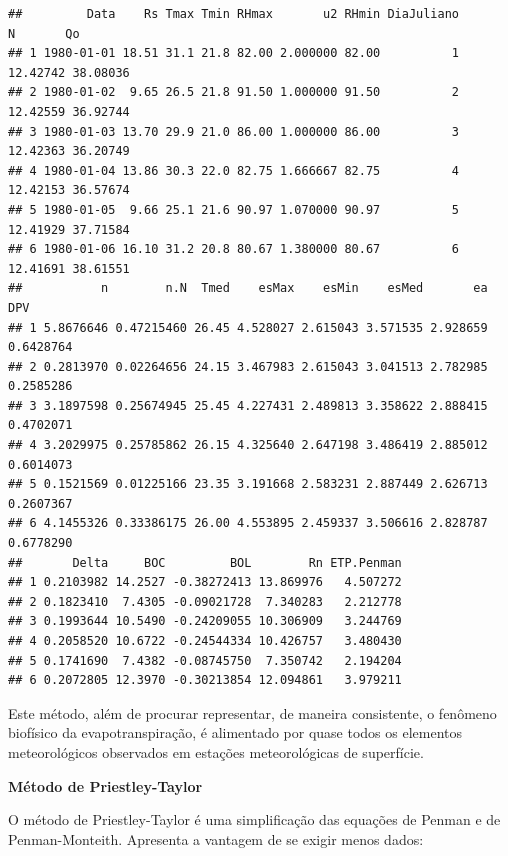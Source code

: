 \documentclass[
]{book}
\newenvironment{Shaded}{\begin{snugshade}}{\end{snugshade}}
\newcommand{\DecValTok}[1]{\textcolor[rgb]{0.00,0.00,0.81}{#1}}
\newcommand{\FloatTok}[1]{\textcolor[rgb]{0.00,0.00,0.81}{#1}}
\newcommand{\KeywordTok}[1]{\textcolor[rgb]{0.13,0.29,0.53}{\textbf{#1}}}
\newcommand{\NormalTok}[1]{#1}
\newcommand{\OperatorTok}[1]{\textcolor[rgb]{0.81,0.36,0.00}{\textbf{#1}}}
\newcommand{\StringTok}[1]{\textcolor[rgb]{0.31,0.60,0.02}{#1}}
\begin{document}
\begin{verbatim}
##         Data    Rs Tmax Tmin RHmax       u2 RHmin DiaJuliano        N       Qo
## 1 1980-01-01 18.51 31.1 21.8 82.00 2.000000 82.00          1 12.42742 38.08036
## 2 1980-01-02  9.65 26.5 21.8 91.50 1.000000 91.50          2 12.42559 36.92744
## 3 1980-01-03 13.70 29.9 21.0 86.00 1.000000 86.00          3 12.42363 36.20749
## 4 1980-01-04 13.86 30.3 22.0 82.75 1.666667 82.75          4 12.42153 36.57674
## 5 1980-01-05  9.66 25.1 21.6 90.97 1.070000 90.97          5 12.41929 37.71584
## 6 1980-01-06 16.10 31.2 20.8 80.67 1.380000 80.67          6 12.41691 38.61551
##           n        n.N  Tmed    esMax    esMin    esMed       ea       DPV
## 1 5.8676646 0.47215460 26.45 4.528027 2.615043 3.571535 2.928659 0.6428764
## 2 0.2813970 0.02264656 24.15 3.467983 2.615043 3.041513 2.782985 0.2585286
## 3 3.1897598 0.25674945 25.45 4.227431 2.489813 3.358622 2.888415 0.4702071
## 4 3.2029975 0.25785862 26.15 4.325640 2.647198 3.486419 2.885012 0.6014073
## 5 0.1521569 0.01225166 23.35 3.191668 2.583231 2.887449 2.626713 0.2607367
## 6 4.1455326 0.33386175 26.00 4.553895 2.459337 3.506616 2.828787 0.6778290
##       Delta     BOC         BOL        Rn ETP.Penman
## 1 0.2103982 14.2527 -0.38272413 13.869976   4.507272
## 2 0.1823410  7.4305 -0.09021728  7.340283   2.212778
## 3 0.1993644 10.5490 -0.24209055 10.306909   3.244769
## 4 0.2058520 10.6722 -0.24544334 10.426757   3.480430
## 5 0.1741690  7.4382 -0.08745750  7.350742   2.194204
## 6 0.2072805 12.3970 -0.30213854 12.094861   3.979211
\end{verbatim}

Este método, além de procurar representar, de maneira consistente, o fenômeno biofísico da evapotranspiração, é alimentado por quase todos os elementos meteorológicos observados em estações meteorológicas de superfície.

\textbf{Método de Priestley-Taylor}

O método de Priestley-Taylor é uma simplificação das equações de Penman e de Penman-Monteith. Apresenta a vantagem de se exigir menos dados:

\begin{Shaded}
\end{Shaded}
\end{document}
